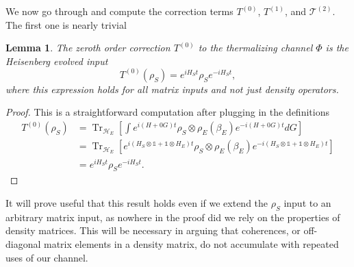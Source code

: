 \documentclass{article}
\newtheorem{lemma}[theorem]{Lemma}
\newcommand{\brackets}[1]{\left[ #1 \right]}
\DeclareMathOperator{\Tr}{Tr}
\newcommand{\partrace}[2]{\Tr_{#1} \brackets{ #2 }}
\newcommand{\hilb}{\mathcal{H}}
\newcommand{\identity}{\mathds{1}}
\begin{document}
We now go through and compute the correction terms $T^{(0)}$, $T^{(1)}$, and $\mathcal{T}^{(2)}$. The first one is nearly trivial
\begin{lemma}
    The zeroth order correction $T^{(0)}$ to the thermalizing channel $\Phi$ is the Heisenberg evolved input 
    \begin{equation}
        T^{(0)}(\rho_S) = e^{i H_S t} \rho_S e^{-i H_S t},
    \end{equation}
    where this expression holds for all matrix inputs and not just density operators.
\end{lemma}
\begin{proof}
This is a straightforward computation after plugging in the definitions
    \begin{align}
        T^{(0)}(\rho_S) &= \partrace{\hilb_E}{\int e^{i(H + 0 G)t} \rho_S \otimes \rho_E(\beta_E) e^{-i(H + 0 G)t} dG } \\
        &= \partrace{\hilb_E}{e^{i (H_S \otimes \identity + \identity \otimes H_E)t} \rho_S \otimes \rho_E(\beta_E) e^{-i (H_S \otimes \identity + \identity \otimes H_E)t}} \\
        &= e^{i H_S t} \rho_S e^{-i H_S t}.
    \end{align}
\end{proof}
It will prove useful that this result holds even if we extend the $\rho_S$ input to an arbitrary matrix input, as nowhere in the proof did we rely on the properties of density matrices. This will be necessary in arguing that coherences, or off-diagonal matrix elements in a density matrix, do not accumulate with repeated uses of our channel.
\end{document}
